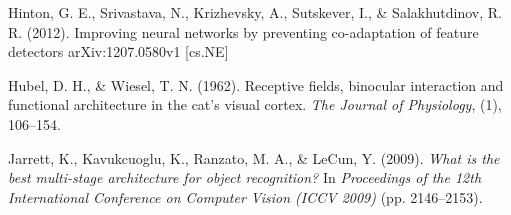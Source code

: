 \documentclass{article} %
\begin{document}
\begin{thebibliography}{100}
Hinton, G. E., Srivastava, N., Krizhevsky, A., Sutskever, I., \& Salakhutdinov, R. R. (2012). 
\newblock Improving neural networks by preventing co-adaptation of feature detectors
\newblock arXiv:1207.0580v1  [cs.NE]

Hubel, D. H., \& Wiesel, T. N. (1962). 
\newblock Receptive fields, binocular interaction and functional architecture in the cat's visual cortex. 
\newblock \emph{The Journal of Physiology}, (1), 106--154.



Jarrett, K., Kavukcuoglu, K., Ranzato, M. A., \& LeCun, Y. (2009). 
\newblock \emph{What is the best multi-stage architecture for object recognition?} 
\newblock In \emph{Proceedings of the 12th International Conference on Computer Vision (ICCV 2009)} (pp. 2146--2153). %





\end{thebibliography}
\end{document}

